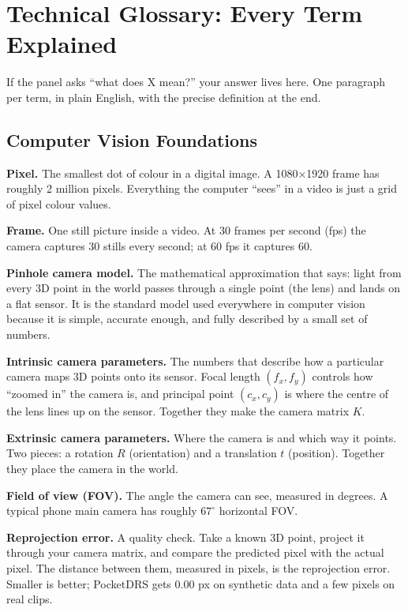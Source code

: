 \documentclass[11pt,a4paper]{article}
\begin{document}
\section{Technical Glossary: Every Term Explained}

If the panel asks ``what does X mean?'' your answer lives here. One paragraph per term, in plain English, with the precise definition at the end.

\subsection{Computer Vision Foundations}

\textbf{Pixel.} The smallest dot of colour in a digital image. A 1080$\times$1920 frame has roughly 2 million pixels. Everything the computer ``sees'' in a video is just a grid of pixel colour values.

\textbf{Frame.} One still picture inside a video. At 30 frames per second (fps) the camera captures 30 stills every second; at 60 fps it captures 60.

\textbf{Pinhole camera model.} The mathematical approximation that says: light from every 3D point in the world passes through a single point (the lens) and lands on a flat sensor. It is the standard model used everywhere in computer vision because it is simple, accurate enough, and fully described by a small set of numbers.

\textbf{Intrinsic camera parameters.} The numbers that describe how a particular camera maps 3D points onto its sensor. Focal length $(f_x, f_y)$ controls how ``zoomed in'' the camera is, and principal point $(c_x, c_y)$ is where the centre of the lens lines up on the sensor. Together they make the camera matrix $K$.

\textbf{Extrinsic camera parameters.} Where the camera is and which way it points. Two pieces: a rotation $R$ (orientation) and a translation $t$ (position). Together they place the camera in the world.

\textbf{Field of view (FOV).} The angle the camera can see, measured in degrees. A typical phone main camera has roughly $67^{\circ}$ horizontal FOV.

\textbf{Reprojection error.} A quality check. Take a known 3D point, project it through your camera matrix, and compare the predicted pixel with the actual pixel. The distance between them, measured in pixels, is the reprojection error. Smaller is better; PocketDRS gets 0.00 px on synthetic data and a few pixels on real clips.
\end{document}

